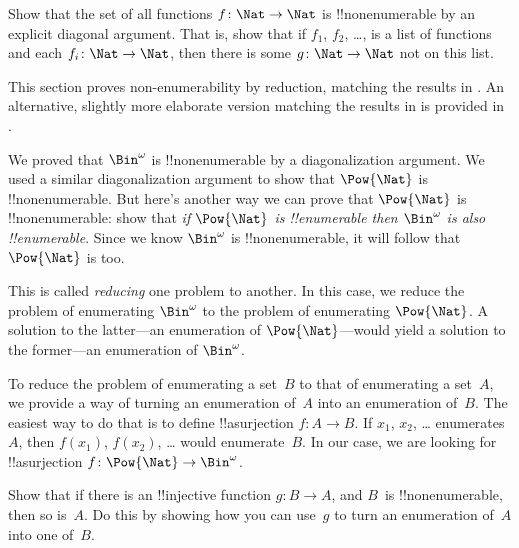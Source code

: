 \begin{prob}
Show that the set of all functions $f \colon \Nat \to \Nat$ is
!!{nonenumerable} by an explicit diagonal argument. That is, show that
if $f_1$, $f_2$, \dots, is a list of functions and each $f_i\colon
\Nat \to \Nat$, then there is some $g \colon \Nat \to
\Nat$ not on this list.
\end{prob}






\begin{editorial}
  This section proves non-enumerability by reduction, matching the
  results in . An alternative, slightly more
  elaborate version matching the results in  is
  provided in .
\end{editorial}

We proved that $\Bin^\omega$ is !!{nonenumerable} by a diagonalization
argument. We used a similar diagonalization argument to show that
$\Pow{\Nat}$ is !!{nonenumerable}. But here's another way we can prove
that $\Pow{\Nat}$ is !!{nonenumerable}: show that \emph{if
$\Pow{\Nat}$ is !!{enumerable} then $\Bin^\omega$ is also
!!{enumerable}}.  Since we know $\Bin^\omega$ is !!{nonenumerable}, it
will follow that $\Pow{\Nat}$ is too.  

This is called \emph{reducing} one problem to another. In this case,
we reduce the problem of enumerating $\Bin^\omega$ to the problem of
enumerating $\Pow{\Nat}$.  A solution to the latter---an enumeration
of $\Pow{\Nat}$---would yield a solution to the former---an
enumeration of $\Bin^\omega$.

To reduce the problem of enumerating a set~$B$ to that of enumerating
a set~$A$, we provide a way of turning an enumeration of~$A$ into an
enumeration of~$B$.  The easiest way to do that is to define
!!a{surjection} $f\colon A \to B$.  If $x_1$, $x_2$, \dots{}
enumerates~$A$, then $f(x_1)$, $f(x_2)$, \dots{} would enumerate~$B$.
In our case, we are looking for !!a{surjection} $f\colon \Pow{\Nat}
\to \Bin^\omega$.

\begin{prob}
Show that if there is an !!{injective} function $g\colon B \to A$, and
$B$~is !!{nonenumerable}, then so is~$A$. Do this by showing how you
can use~$g$ to turn an enumeration of~$A$ into one of~$B$.
\end{prob}

